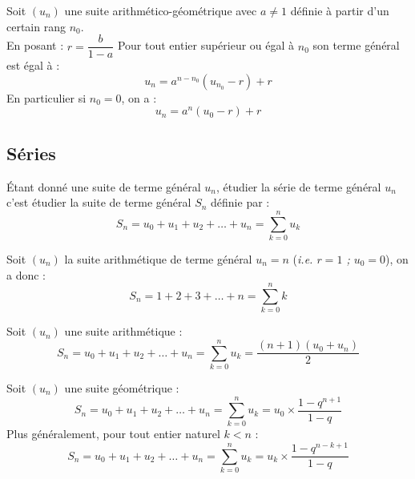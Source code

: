 \documentclass[11pt]{article}
\begin{document}
\begin{theoreme}
Soit $(u_n)$ une suite arithmético-géométrique avec $a \neq 1$ définie à
partir d'un certain rang $n_0$.\\
En posant : $r = \dfrac{b}{1-a}$
Pour tout entier supérieur ou égal à $n_0$ son terme général est égal
à :
\[ u_n = a^{n-n_0}(u_{n_0}-r)+r\]
En particulier si $n_0=0$, on a : 
\[ u_n = a^n(u_0-r)+r\]
\end{theoreme}


\subsection{Séries}

\begin{definition}
Étant donné une suite de terme général $u_n$, étudier la série de
terme général $u_n $ c'est étudier la suite de terme général $S_n$
définie par :
\[ S_n = u_0 + u_1 + u_2 + \ldots + u_n = \sum_{k=0}^{n} u_k \]
\end{definition}

\begin{exemple}
Soit $(u_n)$ la suite arithmétique de terme général $u_n=n$
(\textit{i.e. $r=1$ ; $u_0=0$}), on a donc : 
\[ S_n = 1 + 2 + 3 + \ldots + n = \sum_{k=0}^{n} k \]
\end{exemple}

\begin{theoreme}
Soit $(u_n)$ une suite arithmétique :
\[ S_n = u_0 + u_1 + u_2 + \ldots + u_n = \sum_{k=0}^{n} u_k = \dfrac{(n+1)(u_0+u_n)}{2} \]
\end{theoreme}

\begin{theoreme}
Soit $(u_n)$ une suite géométrique :
\[ S_n = u_0 + u_1 + u_2 + \ldots + u_n = \sum_{k=0}^{n} u_k = u_0
\times \dfrac{1-q^{n+1}}{1-q} \]
Plus généralement, pour tout entier naturel $k<n$ :
\[ S_n = u_0 + u_1 + u_2 + \ldots + u_n = \sum_{k=0}^{n} u_k = u_k
\times \dfrac{1-q^{n-k+1}}{1-q} \]
\end{theoreme}
\end{document}
